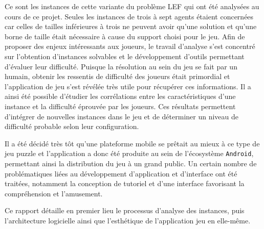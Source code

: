 \documentclass[../main.tex]{subfiles}
\begin{document}
    Ce sont les instances de cette variante du problème LEF qui ont été analysées au cours de ce projet. Seules les instances de trois à sept agents étaient concernées car celles de tailles inférieures à trois ne peuvent avoir qu'une solution et qu'une borne de taille était nécessaire à cause du support choisi pour le jeu. Afin de proposer des enjeux intéressants aux joueurs, le travail d'analyse s'est concentré sur l'obtention d'instances solvables et le développement d'outils permettant d'évaluer leur difficulté. Puisque la résolution au sein du jeu se fait  par un humain, obtenir les ressentis de difficulté des joueurs était primordial et l'application de jeu s'est révélée très utile pour récupérer ces informations. Il a ainsi été possible d'étudier les corrélations entre les caractéristiques d'une instance et la difficulté éprouvée par les joueurs. Ces résultats permettent d'intégrer de nouvelles instances dans le jeu et de déterminer un niveau de difficulté probable selon leur configuration.
    	
	Il a été décidé très tôt qu'une plateforme mobile se prêtait au mieux à ce type de jeu puzzle et l'application a donc été produite au sein de l'écosystème \texttt{Android}, permettant ainsi la distribution du jeu à un grand public. Un certain nombre de problématiques liées au développement d'application et d'interface ont été traitées, notamment la conception de tutoriel et d'une interface favorisant la compréhension et l'amusement.
	
	Ce rapport détaille en premier lieu le processus d'analyse des instances, puis l'architecture logicielle ainsi que l'esthétique de l'application jeu en elle-même. 
\end{document}
